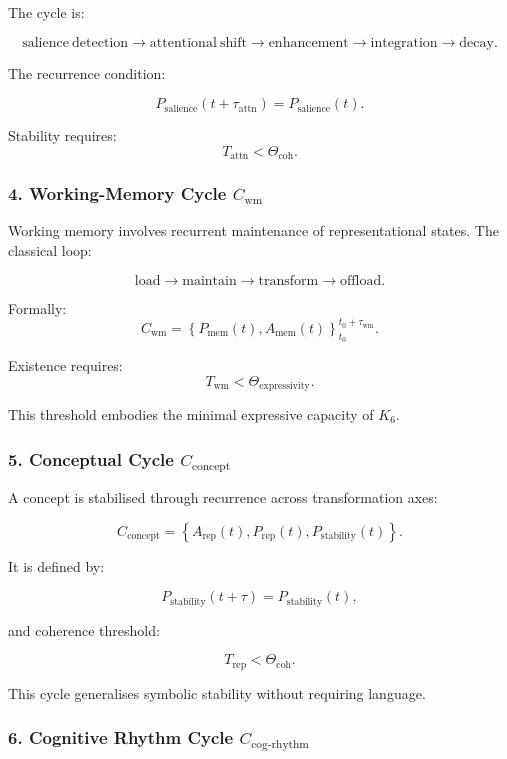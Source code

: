 The cycle is:

\[
  \mathrm{salience\ detection}
  \to
  \mathrm{attentional\ shift}
  \to
  \mathrm{enhancement}
  \to
  \mathrm{integration}
  \to
  \mathrm{decay}.
\]

The recurrence condition:

\[
  P_{\mathrm{salience}}(t+\tau_{\mathrm{attn}}) = P_{\mathrm{salience}}(t).
\]

Stability requires:
\[
  T_{\mathrm{attn}} < \Theta_{\mathrm{coh}}.
\]

\subsubsection{4. Working-Memory Cycle $C_{\mathrm{wm}}$}

Working memory involves recurrent maintenance of representational states.
The classical loop:

\[
 \mathrm{load}
 \to
 \mathrm{maintain}
 \to
 \mathrm{transform}
 \to
 \mathrm{offload}.
\]

Formally:
\[
 C_{\mathrm{wm}} =
 \left\{
   P_{\mathrm{mem}}(t), A_{\mathrm{mem}}(t)
 \right\}_{t_0}^{t_0+\tau_{\mathrm{wm}}}.
\]

Existence requires:
\[
 T_{\mathrm{wm}} < \Theta_{\mathrm{expressivity}}.
\]

This threshold embodies the minimal expressive capacity of $K_6$.

\subsubsection{5. Conceptual Cycle $C_{\mathrm{concept}}$}

A concept is stabilised through recurrence across transformation axes:

\[
  C_{\mathrm{concept}}
    = \left\{
      A_{\mathrm{rep}}(t),
      P_{\mathrm{rep}}(t),
      P_{\mathrm{stability}}(t)
    \right\}.
\]

It is defined by:

\[
  P_{\mathrm{stability}}(t+\tau) = P_{\mathrm{stability}}(t),
\]

and coherence threshold:

\[
  T_{\mathrm{rep}} < \Theta_{\mathrm{coh}}.
\]

This cycle generalises symbolic stability without requiring language.

\subsubsection{6. Cognitive Rhythm Cycle $C_{\mathrm{cog\text{-}rhythm}}$}

